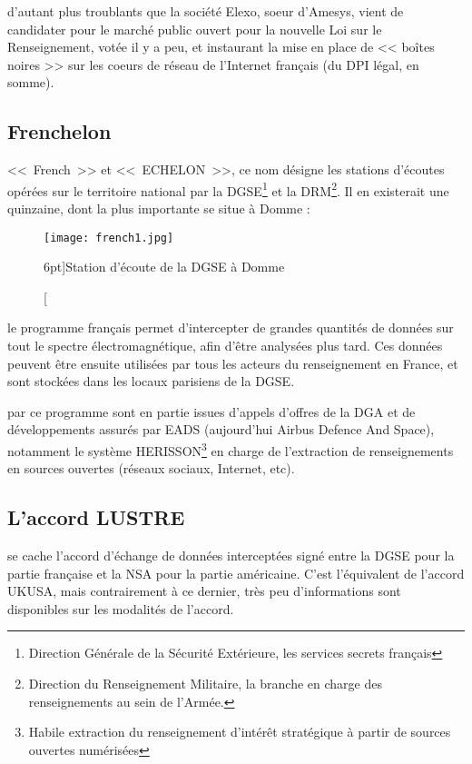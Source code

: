  d'autant plus troublants que la société Elexo, soeur
d'Amesys, vient de candidater\autocite{elexo} pour le marché public ouvert pour la
nouvelle Loi sur le Renseignement, votée il y a peu, et instaurant la mise en place de <<
boîtes noires >> sur les coeurs de réseau de l'Internet français\autocite{LR} (du
DPI légal, en somme).

\newpage
\subsection{Frenchelon}

 <<~French~>> et <<~ECHELON~>>, ce nom
désigne les stations d'écoutes opérées sur le territoire national par la
DGSE\footnote{Direction Générale de la Sécurité Extérieure, les services secrets
français} et la DRM\footnote{Direction du Renseignement Militaire, la branche
en charge des renseignements au sein de l'Armée.}. Il en existerait une
quinzaine, dont la plus importante se situe à Domme :

\vspace{0.7cm}
\begin{figure}
\texttt{[image: french1.jpg]}
\caption[Station d'écoute de Domme][6pt]{Station d'écoute de la DGSE
à Domme}
\label{fig:french1}
\end{figure}


 le programme français permet d'intercepter de
grandes quantités de données sur tout le spectre électromagnétique, afin d'être
analysées plus tard. Ces données peuvent être ensuite utilisées par tous les
acteurs du renseignement en France, et sont stockées dans les locaux parisiens
de la DGSE.\autocite{bbf}

 par ce programme sont en partie issues
d'appels d'offres de la DGA et de développements assurés par EADS (aujourd'hui
Airbus Defence And Space), notamment le système HERISSON\footnote{Habile
extraction du renseignement d'intérêt stratégique à partir de sources ouvertes
numérisées}\autocite{herisson} en charge de l'extraction de renseignements en
sources ouvertes (réseaux sociaux, Internet, etc).

\newpage
\subsection{L'accord LUSTRE}

 se cache l'accord d'échange de données
interceptées signé entre la DGSE pour la partie française et la NSA pour la
partie américaine. C'est l'équivalent de l'accord UKUSA, mais contrairement à ce
dernier, très peu d'informations sont disponibles sur les modalités de l'accord.

